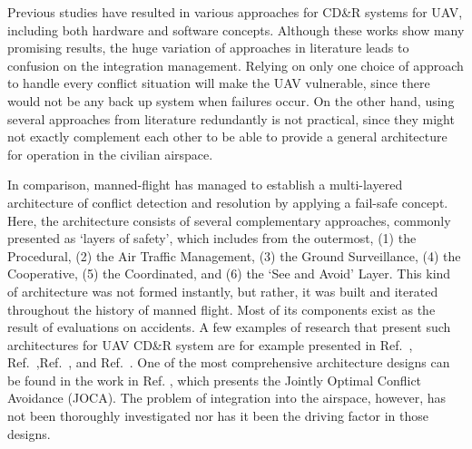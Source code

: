 Previous studies have resulted in various approaches for CD\&R systems for UAV, including both hardware and software concepts. Although these works show many promising results, the huge variation of approaches in literature leads to confusion on the integration management. Relying on only one choice of approach to handle every conflict situation will make the UAV vulnerable, since there would not be any back up system when failures occur. On the other hand, using several approaches from literature redundantly is not practical, since they might not exactly complement each other to be able to provide a general architecture for operation in the civilian airspace.

In comparison, manned-flight has managed to establish a multi-layered architecture of conflict detection and resolution by applying a fail-safe concept. Here, the architecture consists of several complementary approaches, commonly presented as `layers of safety'\cite{Dalamagkidis:09}, which includes from the outermost, (1) the Procedural, (2) the Air Traffic Management, (3) the Ground Surveillance, (4) the Cooperative, (5) the Coordinated, and (6) the `See and Avoid' Layer.%
This kind of architecture was not formed instantly, but rather, it was built and iterated throughout the history of manned flight. Most of its components exist as the result of evaluations on accidents\cite{Kochenderfer:12}. A few examples of research that present such architectures for UAV CD\&R system are for example presented in Ref.~\cite{Yang:97}, Ref.~\cite{barfield:00},Ref.~\cite{Contarino01}, and Ref.~\cite{McCalmont:05}. One of the most comprehensive architecture designs can be found in the work in Ref. \cite{Graham:11}, which presents the Jointly Optimal Conflict Avoidance (JOCA). The problem of integration into the airspace, however, has not been thoroughly investigated nor has it been the driving factor in those designs.


